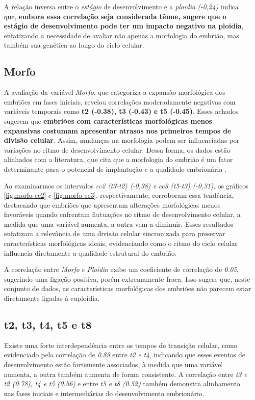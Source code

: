 A relação inversa entre o \textit{estágio} de desenvolvimento e a \textit{ploidia (-0,24)} indica que, \textbf{embora essa correlação seja considerada tênue, sugere que o estágio de desenvolvimento pode ter um impacto negativo na ploidia}, enfatizando a necessidade de avaliar não apenas a morfologia do embrião, mas também sua genética ao longo do ciclo celular. 

\subsection*{Morfo}
A avaliação da variável \textit{Morfo}, que categoriza a expansão morfológica dos embriões em fases iniciais, revelou correlações moderadamente negativas com variáveis temporais como \textbf{t2 (-0.38), t3 (-0.43) e t5 (-0.45)}. Esses achados sugerem que \textbf{embriões com características morfológicas menos expansivas costumam apresentar atrasos nos primeiros tempos de divisão celular}. Assim, mudanças na morfologia podem ser influenciadas por variações no ritmo de desenvolvimento celular. Dessa forma, os dados estão alinhados com a literatura, que cita que a morfologia do embrião é um fator determinante para o potencial de implantação e a qualidade embrionária .

Ao examinarmos os intervalos \textit{cc2 (t3-t2) (-0,38) e cc3 (t5-t3) (-0,31)}, os gráficos \ref{fig:morfo-cc2} e \ref{fig:morfo-cc3}, respectivamente, corroboram essa tendência, destacando que embriões que apresentam alterações morfológicas menos favoráveis quando enfrentam flutuações no ritmo de desenvolvimento celular, a medida que uma variável aumenta, a outra vem a diminuir. Esses resultados enfatizam a relevância de uma divisão celular sincronizada para preservar características morfológicas ideais, evidenciando como o ritmo do ciclo celular influencia diretamente a qualidade estrutural do embrião.

A correlação entre \textit{Morfo} e \textit{Ploidia} exibe um coeficiente de correlação de \textit{0.05}, sugerindo uma ligação positiva, porém extremamente fraca. Isso sugere que, neste conjunto de dados, as características morfológicas dos embriões não parecem estar diretamente ligadas à euploidia. 

\subsection*{t2, t3, t4, t5 e t8}
Existe uma forte interdependência entre os tempos de transição celular, como evidenciado pela correlação de \textit{0.89} entre \textit{t2 e t4}, indicando que esses eventos de desenvolvimento estão fortemente associados, à medida que uma variável aumenta, a outra também aumenta de forma consistente. A correlação entre \textit{t3 e t2 (0.78), t4 e t5 (0.56)} e entre \textit{t5 e t8 (0.52)} também demonstra alinhamento nas fases iniciais e intermediárias do desenvolvimento embrionário. 

